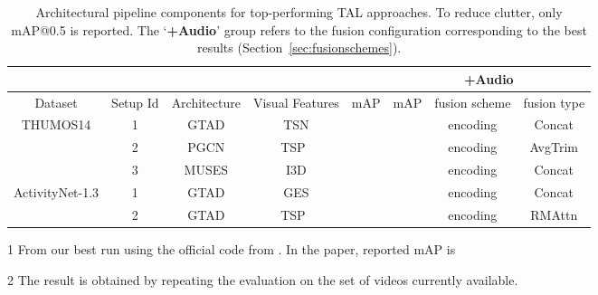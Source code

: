 \documentclass[10pt,twocolumn,letterpaper]{article}
\begin{document}
\begin{table*}[!t]
\centering
\begin{threeparttable}
\resizebox{\linewidth}{!}
{
\centering
\begin{tabular}{c|c|c|c|c|c|c|c}
       & \multicolumn{2}{c|}{ } & \multicolumn{2}{c|}{ } & \multicolumn{3}{c}{\textbf{+Audio}} \\
\toprule
Dataset & Setup Id & Architecture & Visual Features  & mAP & mAP & fusion scheme & fusion type \\
\toprule
\multirow{2}{*}[-0.75em]{\rule{0pt}{2ex} THUMOS14\cite{THUMOS14}}
&  1
&  GTAD\cite{Xu_2020_CVPR} & TSN\cite{8454294} &  &  & encoding & Concat  \\
 & 2 & PGCN\cite{PGCN2019ICCV} & TSP~\cite{DBLP:journals/corr/abs-2011-11479} &  &  & encoding & AvgTrim \\
 & 3 & MUSES\cite{Liu_2021_CVPR} & I3D\cite{8099985}  & \tnote{1} & \cellcolor{SkyBlue} & encoding & Concat \\
 \midrule
  \multirow{2}{*}[0em]{\rule{0pt}{2ex} ActivityNet-1.3\cite{Heilbron_2015_CVPR}}
  &  1
  & GTAD\cite{Xu_2020_CVPR} & GES\cite{xiong2016cuhk}  & \tnote{2} &  & encoding & Concat \\
  &  2
  & GTAD\cite{Xu_2020_CVPR} & TSP~\cite{DBLP:journals/corr/abs-2011-11479} &  & \cellcolor{SkyBlue} & encoding & RMAttn \\
 \bottomrule
\end{tabular}
}

\caption{Architectural pipeline components for top-performing TAL approaches. To reduce clutter, only mAP@0.5 is reported. The `\textbf{+Audio}' group refers to the fusion configuration corresponding to the best results (Section~\ref{sec:fusionschemes}).}
\begin{tablenotes}\scriptsize
 \item[1] From our best run using the official code from \cite{Liu_2021_CVPR}. In the paper, reported mAP is 
 \item[2] The result is obtained by repeating the evaluation on the set of videos currently available.
\end{tablenotes}
\label{tab:archsetup}
\end{threeparttable}
\end{table*}
\end{document}
